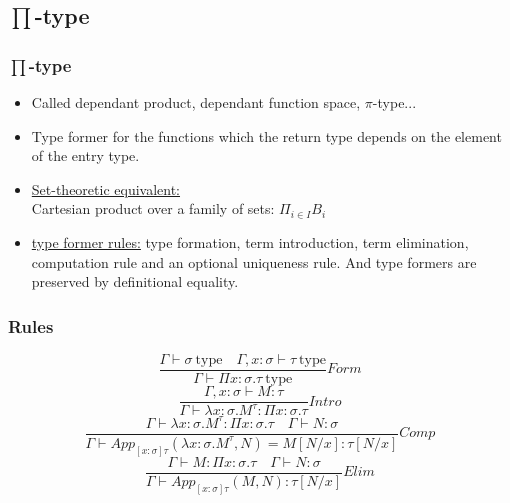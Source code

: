 \documentclass[aspectratio=169]{beamer}
\newcommand{\typ}{\ \mathrm{type}}
\newcommand{\app}[2]{App_{[x:\sigma]\tau}(#1, #2)}
\newcommand{\C}{Comp}
\newcommand{\Intro}{Intro}
\newcommand{\F}{Form}
\newcommand{\E}{Elim}
\begin{document}
    \subsection{$\prod$-type}
    \begin{frame}
        \frametitle{$\prod$-type}
        \begin{itemize}
            \item Called dependant product, dependant function space, $\pi$-type...
            \item Type former for the functions which the return type depends on the element of the entry type.
            \item \underline{Set-theoretic equivalent:}\\
            Cartesian product over a family of sets: $\Pi_{i\in I}B_i$
            \item \underline{type former rules:} type formation, term introduction, term elimination, computation rule and an optional uniqueness rule. And type formers are preserved by definitional equality.
        \end{itemize}
    \end{frame}
    \begin{frame}
        \frametitle{Rules}
        $$\frac{\Gamma \vdash \sigma \typ \quad \Gamma,x:\sigma\vdash \tau \typ}{\Gamma \vdash \Pi x:\sigma.\tau \typ}\F$$
        \vspace{10pt}
        $$\frac{\Gamma, x:\sigma \vdash M : \tau}{\Gamma \vdash \lambda x:\sigma.M^\tau : \Pi x:\sigma.\tau}\Intro$$
        \vspace{10pt}
        $$\frac{\Gamma \vdash \lambda x:\sigma.M^\tau:\Pi x:\sigma.\tau \quad \Gamma \vdash N:\sigma}{\Gamma \vdash \app{\lambda x:\sigma.M^{\tau}}{N} = M[N/x]:\tau[N/x]}\C$$
        \vspace{10pt}
        $$\frac{\Gamma \vdash M : \Pi x: \sigma . \tau \quad \Gamma \vdash N: \sigma}{\Gamma \vdash \app{M}{N}: \tau[N/x]}\E$$
    \end{frame}
\end{document}
